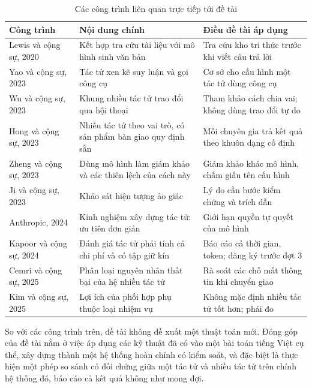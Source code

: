 \begin{table}[!htbp]
\caption{Các công trình liên quan trực tiếp tới đề tài}
\label{tab:lien-quan}
\cobang
\begin{tabularx}{\linewidth}{P{3.6cm}YY}
\toprule
\textbf{Công trình} & \textbf{Nội dung chính} & \textbf{Điều đề tài áp dụng}\\
\midrule
Lewis và cộng sự, 2020  & Kết hợp tra cứu tài liệu với mô hình sinh văn bản & Tra cứu kho tri thức trước khi viết câu trả lời\\
Yao và cộng sự, 2023  & Tác tử xen kẽ suy luận và gọi công cụ & Cơ sở cho cấu hình một tác tử dùng công cụ\\
Wu và cộng sự, 2023  & Khung nhiều tác tử trao đổi qua hội thoại & Tham khảo cách chia vai; không dùng trao đổi tự do\\
Hong và cộng sự, 2023  & Nhiều tác tử theo vai trò, có sản phẩm bàn giao quy định sẵn & Mỗi chuyên gia trả kết quả theo khuôn dạng cố định\\
Zheng và cộng sự, 2023  & Dùng mô hình làm giám khảo và các thiên lệch của cách này & Giám khảo khác mô hình, chấm giấu tên cấu hình\\
Ji và cộng sự, 2023  & Khảo sát hiện tượng ảo giác & Lý do cần bước kiểm chứng và trích dẫn\\
Anthropic, 2024  & Kinh nghiệm xây dựng tác tử: ưu tiên đơn giản & Giới hạn quyền tự quyết của mô hình\\
Kapoor và cộng sự, 2024  & Đánh giá tác tử phải tính cả chi phí và có tập giữ kín & Báo cáo cả thời gian, token; đăng ký trước đợt 3\\
Cemri và cộng sự, 2025  & Phân loại nguyên nhân thất bại của hệ nhiều tác tử & Rà soát các chỗ mất thông tin khi chuyển giao\\
Kim và cộng sự, 2025  & Lợi ích của phối hợp phụ thuộc loại nhiệm vụ & Không mặc định nhiều tác tử tốt hơn; phải đo\\
\bottomrule
\end{tabularx}
\end{table}

So với các công trình trên, đề tài không đề xuất một thuật toán mới. Đóng góp của đề tài nằm ở việc áp dụng các kỹ thuật đã có vào một bài toán tiếng Việt cụ thể, xây dựng thành một hệ thống hoàn chỉnh có kiểm soát, và đặc biệt là thực hiện một phép so sánh có đối chứng giữa một tác tử và nhiều tác tử trên chính hệ thống đó, báo cáo cả kết quả không như mong đợi.
